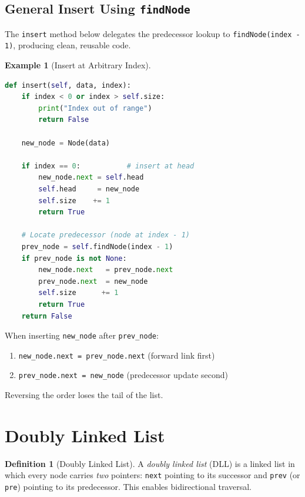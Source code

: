\documentclass[11pt, a4paper, notitlepage]{report}
\theoremstyle{definition}
\newtheorem{definition}[theorem]{Definition}
\theoremstyle{remark}
\theoremstyle{definition}
\newtheorem{example}[theorem]{Example}
\begin{document}
\subsection{General Insert Using \texttt{findNode}}
\label{subsec:sll-insert-findnode}

The \texttt{insert} method below delegates the predecessor lookup to
\texttt{findNode(index - 1)}, producing clean, reusable code.

\begin{example}[Insert at Arbitrary Index]
\leavevmode
\begin{lstlisting}[language=Python]
def insert(self, data, index):
    if index < 0 or index > self.size:
        print("Index out of range")
        return False

    new_node = Node(data)

    if index == 0:           # insert at head
        new_node.next = self.head
        self.head     = new_node
        self.size    += 1
        return True

    # Locate predecessor (node at index - 1)
    prev_node = self.findNode(index - 1)
    if prev_node is not None:
        new_node.next   = prev_node.next
        prev_node.next  = new_node
        self.size      += 1
        return True
    return False
\end{lstlisting}
\end{example}

\begin{keyresult}[title={Key Result: Two-Step Splice Rule}]
When inserting \texttt{new\_node} after \texttt{prev\_node}:
\begin{enumerate}
  \item \texttt{new\_node.next = prev\_node.next} \quad (forward link first)
  \item \texttt{prev\_node.next = new\_node} \quad (predecessor update second)
\end{enumerate}
Reversing the order loses the tail of the list.
\end{keyresult}

\section{Doubly Linked List}
\label{sec:dll}

\begin{definition}[Doubly Linked List]
\label{def:dll}
A \emph{doubly linked list} (DLL) is a linked list in which every node carries
\emph{two} pointers: \texttt{next} pointing to its successor and \texttt{prev}
(or \texttt{pre}) pointing to its predecessor. This enables bidirectional
traversal.
\end{definition}
\end{document}
